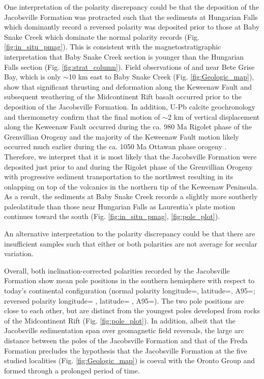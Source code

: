 \documentclass[draft]{agujournal2019}
\begin{document}
One interpretation of the polarity discrepancy could be that the deposition of the Jacobsville Formation was protracted such that the sediments at Hungarian Falls which dominantly record a reversed polarity was deposited prior to those at Baby Snake Creek which dominate the normal polarity records (Fig. \ref{fig:in_situ_pmag}). This is consistent with the magnetostratigraphic interpretation that Baby Snake Creek section is younger than the Hungarian Falls section (Fig. \ref{fig:strat_column}). Field observations of  and  near Bete Grise Bay, which is only $\sim$10 km east to Baby Snake Creek (Fig. \ref{fig:Geologic_map}), show that significant thrusting and deformation along the Keweenaw Fault and subsequent weathering of the Midcontinent Rift basalt occurred prior to the deposition of the Jacobsville Formation. In addition, U-Pb calcite geochronology and thermometry confirm that the final motion of $\sim$2 km of vertical displacement along the Keweenaw Fault occurred during the ca. 980 Ma Rigolet phase of the Grenvillian Orogeny and the majority of the Keweenaw Fault motion likely occurred much earlier during the ca. 1050 Ma Ottawan phase orogeny \cite{Hodgin2022b}. Therefore, we interpret that it is most likely that the Jacobsville Formation were deposited just prior to and during the Rigolet phase of the Grenvillian Orogeny with progressive sediment transportation to the northwest resulting in its onlapping on top of the volcanics in the northern tip of the Keweenaw Peninsula. As a result, the sediments at Baby Snake Creek records a slightly more southerly paleolatitude than those near Hungarian Falls as Laurentia's plate motion continues toward the south (Fig. \ref{fig:in_situ_pmag}, \ref{fig:pole_plot}). 

An alternative interpretation to the polarity discrepancy could be that there are insufficient samples such that either or both polarities are not average for secular variation. 


Overall, both inclination-corrected polarities recorded by the Jacobsville Formation show mean pole positions in the southern hemisphere with respect to today's continental configuration (normal polarity longitude=, latitude=, A95=; reversed polarity longitude= , latitude= , A95=). The two pole positions are close to each other, but are distinct from the youngest poles developed from rocks of the Midcontinent Rift (Fig. \ref{fig:pole_plot}). In addition, albeit that the Jacobsville sedimentation span over geomagnetic field reversals, the large arc distance between the poles of the Jacobsville Formation and that of the Freda Formation precludes the hypothesis that the Jacobsville Formation at the five studied localities (Fig. \ref{fig:Geologic_map}) is coeval with the Oronto Group and formed through a prolonged period of time. 
\end{document}
